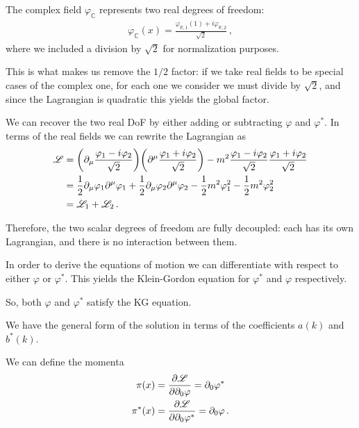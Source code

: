 \documentclass[main.tex]{subfiles}
\begin{document}
The complex field \(\varphi_{\mathbb{C}}\) represents two real degrees of freedom: 
%
\begin{align}
\varphi_{\mathbb{C}} (x) = \frac{\varphi_{\mathbb{R}, 1}(1) + i \varphi_{\mathbb{R}, 2}}{\sqrt{2}}
\,,
\end{align}
%
where we included a division by \(\sqrt{2}\) for normalization purposes.

This is what makes us remove the \(1/2\) factor: if we take real fields to be special cases of the complex one, for each one we consider we must divide by \(\sqrt{2}\), and since the Lagrangian is quadratic this yields the global factor. 

We can recover the two real DoF by either adding or subtracting  \(\varphi \) and \(\varphi^{*}\). 
In terms of the real fields we can rewrite the Lagrangian as 
%
\begin{align}
\mathscr{L} &= \qty(\partial_{\mu } \frac{\varphi_1 -i \varphi_2 }{\sqrt{2}})
\qty(\partial^{\mu } \frac{\varphi_1 +i \varphi_2 }{\sqrt{2}})
- m^2 \frac{\varphi_1 -i \varphi_2 }{\sqrt{2}} \frac{\varphi_1 + i \varphi_2 }{\sqrt{2}}  \\
&= \frac{1}{2} \partial_{\mu } \varphi_1 \partial^{\mu } \varphi_1 
+ \frac{1}{2} \partial_{\mu } \varphi_2 \partial^{\mu } \varphi_2 
- \frac{1}{2} m^2 \varphi_1^2 - \frac{1}{2} m^2 \varphi_2^2  \\
&= \mathscr{L}_{1} + \mathscr{L}_{2}
\,.
\end{align}

Therefore, the two scalar degrees of freedom are fully decoupled: each has its own Lagrangian, and there is no interaction between them.

In order to derive the equations of motion we can differentiate with respect to either \(\varphi \) or \(\varphi^{*}\). This yields the Klein-Gordon equation for \(\varphi^{*}\) and \(\varphi \) respectively. 

So, both \(\varphi \) and \(\varphi^{*}\) satisfy the KG equation. 

We have the general form of the solution in terms of the coefficients \(a(k)\) and \(b^{*}(k)\).

We can define the momenta 
%
\begin{align}
\pi (x) &= \pdv{\mathscr{L}}{\partial_0 \varphi} = \partial_{0} \varphi^{*}  \\
\pi^{*} (x) &= \pdv{\mathscr{L}}{\partial_0 \varphi^{*}} = \partial_{0} \varphi  
\,.
\end{align}
\end{document}
